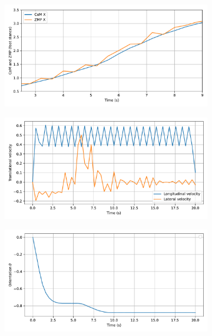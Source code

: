 \begin{figure}[H]
    \centering
    \begin{subfigure}{0.45\linewidth}
        \centering
        \includegraphics[width=\linewidth]{figures/Simulations/sim1circles/evolution_4.pdf}
    \end{subfigure}
    \begin{subfigure}{0.45\linewidth}
        \centering
        \includegraphics[width=\linewidth]{figures/Simulations/sim1circles/evolution_1.pdf}
    \end{subfigure}
    \hfill
    \begin{subfigure}{0.45\linewidth}
        \centering
        \includegraphics[width=\linewidth]{figures/Simulations/sim1circles/evolution_2.pdf}

\end{subfigure}
\end{figure}
